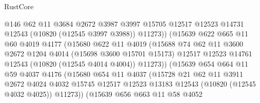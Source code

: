 \begin{lexlean}{RustCore}
\begin{coremodule}
                            @146
                            @62
                            @11
                            @3684
                            @2672
                            @3987
                            @3997
                            @15705
                            @12517
                            @12523
                            @14731
                            @12543
                            (@10820 (@12545 @3997 @3988))
                            @11273))
                        (@15639
                          @622
                          @665
                          @11
                          @60
                          @4019
                          @4177
                          (@15680
                            @622
                            @11
                            @4019
                            (@15688
                              @74
                              @62
                              @11
                              @3600
                              @2672
                              @1204
                              @4014
                              (@15698 @3600 @15701 @15173)
                              @12517
                              @12523
                              @14761
                              @12543
                              (@10820 (@12545 @4014 @4004))
                              @11273))
                          (@15639
                            @654
                            @664
                            @11
                            @59
                            @4037
                            @4176
                            (@15680
                              @654
                              @11
                              @4037
                              (@15728
                                @21
                                @62
                                @11
                                @3911
                                @2672
                                @4024
                                @4032
                                @15745
                                @12517
                                @12523
                                @13183
                                @12543
                                (@10820 (@12545 @4032 @4025))
                                @11273))
                            (@15639
                              @656
                              @663
                              @11
                              @58
                              @4052

\end{coremodule}
\end{lexlean}
